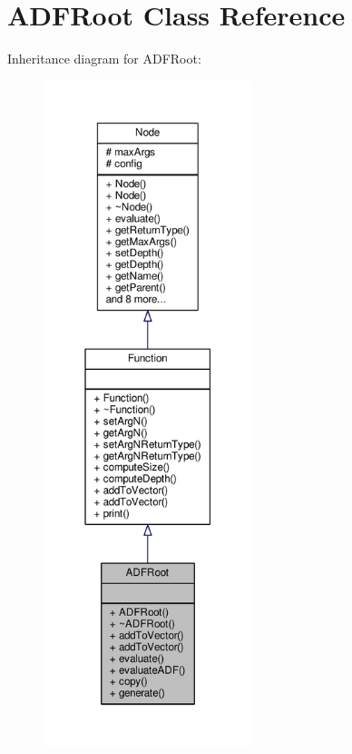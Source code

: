 \hypertarget{classADFRoot}{}\section{A\+D\+F\+Root Class Reference}
\label{classADFRoot}


Inheritance diagram for A\+D\+F\+Root\+:
\nopagebreak
\begin{figure}[H]
\begin{center}
\leavevmode
\includegraphics[height=550pt]{classADFRoot__inherit__graph}
\end{center}
\end{figure}


